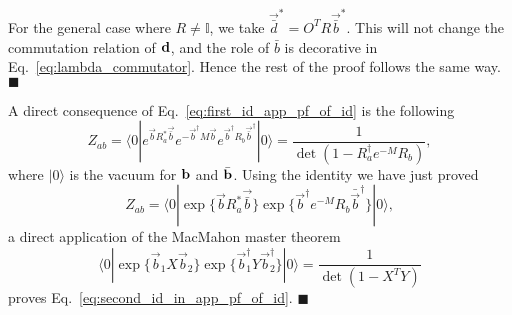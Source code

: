 For the general case where $R \neq\mathbb{I}$, we take $\vec{\bar{d}}^* = O^T R \vec{\bar{b}}^*$. This will not change the commutation relation of ${\bf d}$, and the role of $\bar{b}$ is decorative in Eq.~\eqref{eq:lambda_commutator}. Hence the rest of the proof follows the same way. \hfill$\blacksquare$

A direct consequence of Eq.~\eqref{eq:first_id_app_pf_of_id} is the following
\begin{equation}
\label{eq:second_id_in_app_pf_of_id}
Z_{ab} = \langle 0 | e^{ \vec{b} R_a^* \vec{\bar{b}} } e^{ - \vec{b}^{\dagger} M  \vec{b} } e^{  \vec{b}^{\dagger} R_b  \vec{\bar{b}}^{\dagger} }  |0  \rangle  = \frac{1}{\det( 1- R_a^{\dagger} e^{-M} R_b )} ,
\end{equation}
where $|0\rangle$ is the vacuum for ${\bf b}$ and $\bar{\bf b}$. Using the identity we have just proved
\begin{equation}
Z_{ab} =   \langle 0 | \exp\Big\{ \vec{b} R_a^* \vec{\bar{b}}\Big\}  \exp \Big\{ \vec{b}^{\dagger} e^{-M}  R_b \bar{\vec{b}}^{\dagger}  \Big\}  |0 \rangle ,
\end{equation}
a direct application of the MacMahon master theorem
\begin{equation}
  \langle 0 | \exp \Big\{ \vec{b}_1 X \vec{b}_2 \Big\}  \exp \Big\{ \vec{b}^{\dagger}_1 Y \vec{b}^{\dagger}_2 \Big\}|0  \rangle 
 = \frac{1}{\det(1 - X^T Y )}
\end{equation}
proves Eq.~\eqref{eq:second_id_in_app_pf_of_id}. \hfill$\blacksquare$



